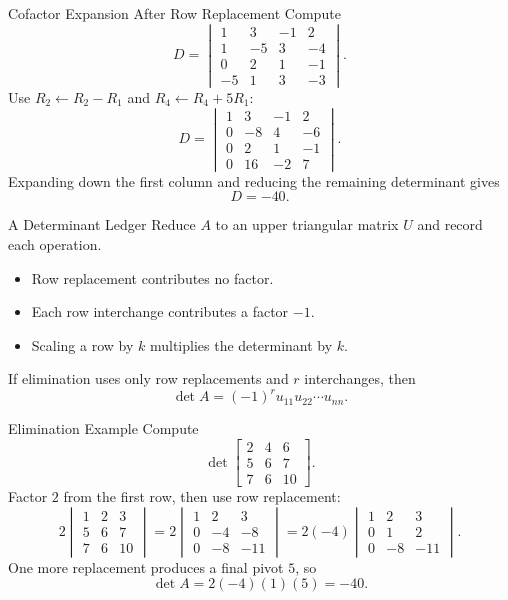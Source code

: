 \documentclass[aspectratio=169]{beamer}
\begin{document}
\begin{frame}{Cofactor Expansion After Row Replacement}
Compute
\[
D=\begin{vmatrix}
1&3&-1&2\\
1&-5&3&-4\\
0&2&1&-1\\
-5&1&3&-3
\end{vmatrix}.
\]
Use $R_2\leftarrow R_2-R_1$ and $R_4\leftarrow R_4+5R_1$:
\[
D=\begin{vmatrix}
1&3&-1&2\\0&-8&4&-6\\0&2&1&-1\\0&16&-2&7
\end{vmatrix}.
\]
\pause
Expanding down the first column and reducing the remaining determinant gives
\[
\boxed{D=-40}.
\]
\end{frame}

\begin{frame}{A Determinant Ledger}
Reduce $A$ to an upper triangular matrix $U$ and record each operation.
\begin{itemize}
  \item Row replacement contributes no factor.
  \item Each row interchange contributes a factor $-1$.
  \item Scaling a row by $k$ multiplies the determinant by $k$.
\end{itemize}
\pause
If elimination uses only row replacements and $r$ interchanges, then
\[
\boxed{\det A=(-1)^r u_{11}u_{22}\cdots u_{nn}}.
\]
\end{frame}

\begin{frame}{Elimination Example}
Compute
\[
\det\begin{bmatrix}2&4&6\\5&6&7\\7&6&10\end{bmatrix}.
\]
Factor $2$ from the first row, then use row replacement:
\[
2\begin{vmatrix}1&2&3\\5&6&7\\7&6&10\end{vmatrix}
=2\begin{vmatrix}1&2&3\\0&-4&-8\\0&-8&-11\end{vmatrix}
=2(-4)\begin{vmatrix}1&2&3\\0&1&2\\0&-8&-11\end{vmatrix}.
\]
One more replacement produces a final pivot $5$, so
\[
\boxed{\det A=2(-4)(1)(5)=-40}.
\]
\end{frame}
\end{document}
